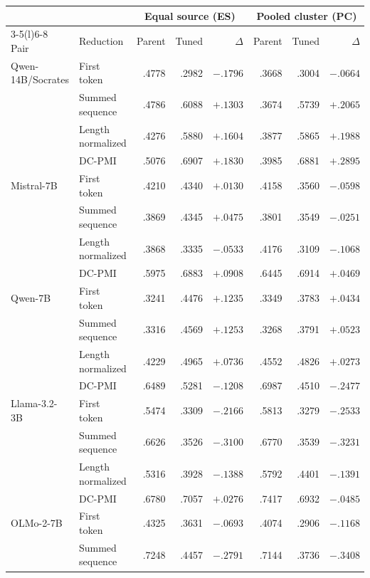 \begin{table}[t]
\centering
\small
\setlength{\tabcolsep}{2.5pt}
\begin{tabular}{@{}llrrr@{\hspace{8pt}}rrr@{}}
\toprule
& & \multicolumn{3}{c}{Equal source (ES)} &
    \multicolumn{3}{c}{Pooled cluster (PC)} \\
\cmidrule(lr){3-5}\cmidrule(l){6-8}
Pair & Reduction & Parent & Tuned & $\Delta$ & Parent & Tuned & $\Delta$ \\
\midrule
Qwen-14B/Socrates & First token & .4778 & .2982 & $-.1796$ & .3668 & .3004 & $-.0664$ \\
& Summed sequence & .4786 & .6088 & $+.1303$ & .3674 & .5739 & $+.2065$ \\
& Length normalized & .4276 & .5880 & $+.1604$ & .3877 & .5865 & $+.1988$ \\
& DC-PMI & .5076 & .6907 & $+.1830$ & .3985 & .6881 & $+.2895$ \\
\addlinespace[2pt]
Mistral-7B & First token & .4210 & .4340 & $+.0130$ & .4158 & .3560 & $-.0598$ \\
& Summed sequence & .3869 & .4345 & $+.0475$ & .3801 & .3549 & $-.0251$ \\
& Length normalized & .3868 & .3335 & $-.0533$ & .4176 & .3109 & $-.1068$ \\
& DC-PMI & .5975 & .6883 & $+.0908$ & .6445 & .6914 & $+.0469$ \\
\addlinespace[2pt]
Qwen-7B & First token & .3241 & .4476 & $+.1235$ & .3349 & .3783 & $+.0434$ \\
& Summed sequence & .3316 & .4569 & $+.1253$ & .3268 & .3791 & $+.0523$ \\
& Length normalized & .4229 & .4965 & $+.0736$ & .4552 & .4826 & $+.0273$ \\
& DC-PMI & .6489 & .5281 & $-.1208$ & .6987 & .4510 & $-.2477$ \\
\addlinespace[2pt]
Llama-3.2-3B & First token & .5474 & .3309 & $-.2166$ & .5813 & .3279 & $-.2533$ \\
& Summed sequence & .6626 & .3526 & $-.3100$ & .6770 & .3539 & $-.3231$ \\
& Length normalized & .5316 & .3928 & $-.1388$ & .5792 & .4401 & $-.1391$ \\
& DC-PMI & .6780 & .7057 & $+.0276$ & .7417 & .6932 & $-.0485$ \\
\addlinespace[2pt]
OLMo-2-7B & First token & .4325 & .3631 & $-.0693$ & .4074 & .2906 & $-.1168$ \\
& Summed sequence & .7248 & .4457 & $-.2791$ & .7144 & .3736 & $-.3408$ \\

\end{tabular}
\end{table}
